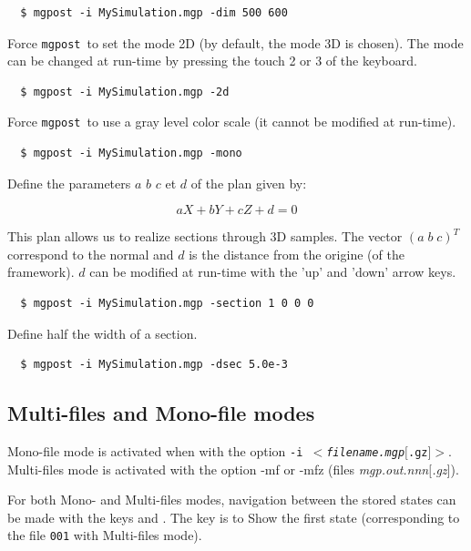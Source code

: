 \documentclass{simpledoc}
\newcommand{\mgpost}{\texttt{mgpost}\ }
\newcommand{\var}[1]{$<$#1$>$}
\newcommand{\opt}[1]{$[$#1$]$}
\newcommand{\file}[1]{\textit{#1}}
\newcommand{\screen}[1]{\texttt{#1}}
\newcommand{\key}[1]{\fbox{#1}}
\begin{document}
\begin{verbatim}
  $ mgpost -i MySimulation.mgp -dim 500 600
\end{verbatim}

Force \mgpost to set the mode 2D (by default, the mode 3D is chosen). The mode can be changed at run-time by pressing the touch 2 or 3 of the keyboard.

\begin{verbatim}
  $ mgpost -i MySimulation.mgp -2d
\end{verbatim}

Force \mgpost to use a gray level color scale (it cannot be modified at run-time).

\begin{verbatim}
  $ mgpost -i MySimulation.mgp -mono
\end{verbatim}

\marginlabel{\texttt{-section \var{a} \var{b} \var{c} \var{d}}}
Define the parameters  $a$ $b$ $c$ et $d$ of the plan given by:

\begin{equation}
aX + bY + cZ + d = 0 
\end{equation}

This plan allows us to realize sections through 3D samples.
The vector $(a\;b\;c)^T$ correspond to the normal and 
 $d$ is the distance from the origine (of the  framework).
$d$ can be modified at run-time with the 'up' and 'down' arrow keys.

\begin{verbatim}
  $ mgpost -i MySimulation.mgp -section 1 0 0 0
\end{verbatim}

\marginlabel{\texttt{-dsec \var{distance}}}
Define half the width of a section.

\begin{verbatim}
  $ mgpost -i MySimulation.mgp -dsec 5.0e-3
\end{verbatim}

\subsection{Multi-files and Mono-file modes}

Mono-file mode is activated when with the option \screen{-i \var{\file{filename.mgp}\opt{.gz}}}.
Multi-files mode is activated with the option -mf or -mfz (files \file{mgp.out.\textit{nnn}\opt{.gz}}).

For both Mono- and Multi-files modes, navigation between the stored states can be made with the keys \key{+} and \key{-}. The key \key{0} is to Show the first state (corresponding to the file \screen{001} with Multi-files mode).
\end{document}
